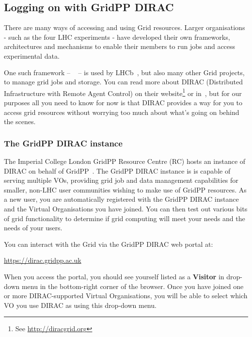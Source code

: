 \subsection{Logging on with GridPP DIRAC}
\label{sec:logondirac}
There are many ways of accessing and using Grid resources. Larger
organisations - such as the four LHC experiments - have developed their
own frameworks, architectures and mechanisms to enable their members to
run jobs and access experimental data.

One such framework -- ~\cite{DIRAC2010} -- is used by
LHCb~\cite{LHCb2008}, but also many other Grid
projects, to manage grid jobs and storage.
You can read more about DIRAC
(Distributed Infrastructure with Remote Agent Control)
on their website\footnote{%
See \href{http://diracgrid.org}{http://diracgrid.org}}
or in~\cite{DIRAC2010},
but for our purposes all you need to
know for now is that DIRAC provides a way for you to access grid
resources without worrying too much about what's going on behind the
scenes.

\subsubsection{The GridPP DIRAC instance}
\label{the-gridpp-dirac-instance}
The Imperial College London GridPP Resource Centre (RC) hosts an
instance of DIRAC on behalf of GridPP~\cite{GRIDPPDIRAC2015a,GRIDPPDIRAC2015b}.
The GridPP DIRAC instance is is
capable of serving multiple VOs, providing grid job and data management
capabilities for smaller, non-LHC user communities wishing to make use
of GridPP resources. As a new user, you are automatically registered
with the GridPP DIRAC instance and the Virtual Organisations you have
joined. You can then test out various bits of grid functionality to
determine if grid computing will meet your needs and the needs of your
users.

You can interact with the Grid via the GridPP DIRAC web portal at:

\url{https://dirac.gridpp.ac.uk}

When you access the portal, you should
see yourself listed as a \textbf{Visitor} in drop-down menu in the
bottom-right corner of the browser. Once you have joined one or more
DIRAC-supported Virtual Organisations, you will be able to select which
VO you use DIRAC as using this drop-down menu.

